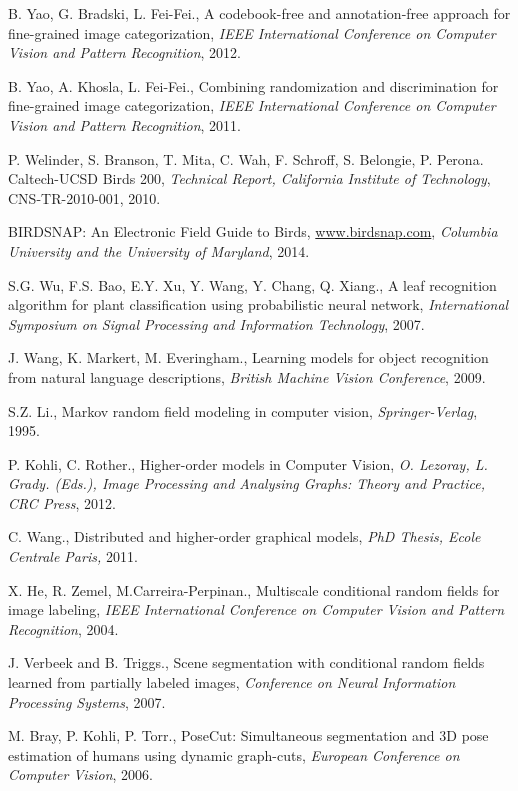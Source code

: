 \documentclass{article}
\begin{document}
\begin{thebibliography}{100}
B. Yao, G. Bradski, L. Fei-Fei., 
A codebook-free and annotation-free approach for fine-grained image categorization, 
\emph{IEEE International Conference on Computer Vision and Pattern Recognition},
2012. 

B. Yao, A. Khosla, L. Fei-Fei., 
Combining randomization and discrimination for fine-grained image categorization,
\emph{IEEE International Conference on Computer Vision and Pattern Recognition}, 2011. 

P. Welinder, S. Branson, T. Mita, C. Wah, F. Schroff, S. Belongie, P. Perona. 
Caltech-UCSD Birds 200, 
\emph{Technical Report, California Institute of Technology},
CNS-TR-2010-001, 2010. 

BIRDSNAP: An Electronic Field Guide to Birds, \url{www.birdsnap.com}, 
\emph{Columbia University and the University of Maryland},
2014. 

S.G. Wu, F.S. Bao, E.Y. Xu, Y. Wang, Y. Chang, Q. Xiang.,
A leaf recognition algorithm for plant classification using probabilistic neural network,
\emph{International Symposium on Signal Processing and Information Technology}, 2007. 

J. Wang, K. Markert, M. Everingham., 
Learning models for object recognition from natural language descriptions, 
\emph{British Machine Vision Conference}, 2009. 

S.Z. Li., Markov random field modeling in computer vision, 
\emph{Springer-Verlag}, 1995. 

P. Kohli, C. Rother., 
Higher-order models in Computer Vision, 
\emph{O. Lezoray, L. Grady. (Eds.),
Image Processing and Analysing Graphs: Theory and Practice, CRC Press},
2012. 

C. Wang., 
Distributed and higher-order graphical models, 
\emph{PhD Thesis, Ecole Centrale Paris,} 2011.

X. He, R. Zemel, M.Carreira-Perpinan., 
Multiscale conditional random fields for image labeling, 
\emph{IEEE International Conference on Computer Vision and Pattern Recognition},
2004. 

J. Verbeek and B. Triggs., 
Scene segmentation with conditional random fields learned from partially labeled images, 
\emph{Conference on Neural Information Processing Systems}, 2007. 

M. Bray, P. Kohli, P. Torr., 
PoseCut: Simultaneous segmentation and 3D pose estimation of humans using dynamic graph-cuts,
\emph{European Conference on Computer Vision}, 2006. 


\end{thebibliography}
\end{document}
